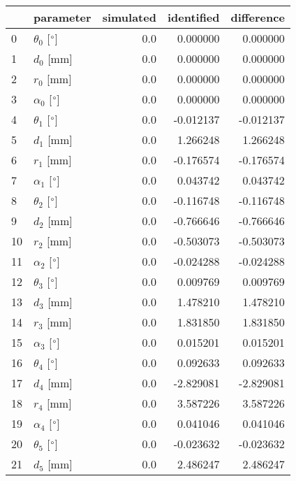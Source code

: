 \documentclass{standalone}%
\begin{document}
%
\normalsize%
\begin{tabular}{llrrr}
\toprule
{} &                 parameter & simulated & identified & difference \\
\midrule
0  &  $\theta_{0}$ [$\degree$] &       0.0 &   0.000000 &   0.000000 \\
1  &              $d_{0}$ [mm] &       0.0 &   0.000000 &   0.000000 \\
2  &              $r_{0}$ [mm] &       0.0 &   0.000000 &   0.000000 \\
3  &  $\alpha_{0}$ [$\degree$] &       0.0 &   0.000000 &   0.000000 \\
4  &  $\theta_{1}$ [$\degree$] &       0.0 &  -0.012137 &  -0.012137 \\
5  &              $d_{1}$ [mm] &       0.0 &   1.266248 &   1.266248 \\
6  &              $r_{1}$ [mm] &       0.0 &  -0.176574 &  -0.176574 \\
7  &  $\alpha_{1}$ [$\degree$] &       0.0 &   0.043742 &   0.043742 \\
8  &  $\theta_{2}$ [$\degree$] &       0.0 &  -0.116748 &  -0.116748 \\
9  &              $d_{2}$ [mm] &       0.0 &  -0.766646 &  -0.766646 \\
10 &              $r_{2}$ [mm] &       0.0 &  -0.503073 &  -0.503073 \\
11 &  $\alpha_{2}$ [$\degree$] &       0.0 &  -0.024288 &  -0.024288 \\
12 &  $\theta_{3}$ [$\degree$] &       0.0 &   0.009769 &   0.009769 \\
13 &              $d_{3}$ [mm] &       0.0 &   1.478210 &   1.478210 \\
14 &              $r_{3}$ [mm] &       0.0 &   1.831850 &   1.831850 \\
15 &  $\alpha_{3}$ [$\degree$] &       0.0 &   0.015201 &   0.015201 \\
16 &  $\theta_{4}$ [$\degree$] &       0.0 &   0.092633 &   0.092633 \\
17 &              $d_{4}$ [mm] &       0.0 &  -2.829081 &  -2.829081 \\
18 &              $r_{4}$ [mm] &       0.0 &   3.587226 &   3.587226 \\
19 &  $\alpha_{4}$ [$\degree$] &       0.0 &   0.041046 &   0.041046 \\
20 &  $\theta_{5}$ [$\degree$] &       0.0 &  -0.023632 &  -0.023632 \\
21 &              $d_{5}$ [mm] &       0.0 &   2.486247 &   2.486247 \\

\end{tabular}
\end{document}
